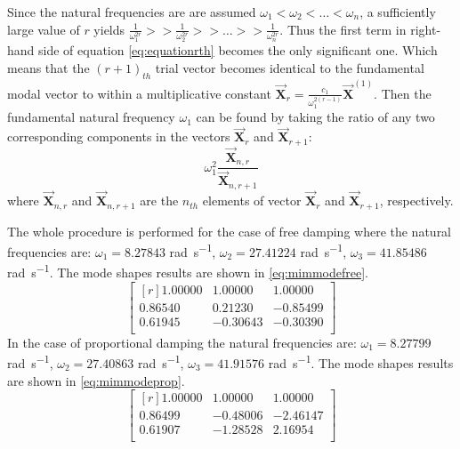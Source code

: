 Since the natural frequencies are are assumed \(\omega_1 < \omega_2 < \dots <
\omega_n\), a sufficiently large value of \(r\) yields \(\frac{1}{\omega_1^{2r}}
>> \frac{1}{\omega_2^{2r}} >> \dots >> \frac{1}{\omega_n^{2r}}\). Thus the first
term in right-hand side of equation \eqref{eq:equationrth} becomes the only
significant one.
Which means that the \((r+1)_{th}\) trial vector becomes identical to the
fundamental modal vector to within a multiplicative constant
\(\vec{\mathbf{X}}_{r} = \frac{c_1}{\omega^{2(r-1)}_{1}}\vec{\mathbf{X}}^{(1)}\).
Then the fundamental natural frequency \(\omega_1\) can be found by taking the
ratio of any two corresponding components in the vectors \(\vec{\mathbf{X}}_{r}\)
and \(\vec{\mathbf{X}}_{r+1}\):
\begin{equation}
  \omega_1^{2} \frac{\vec{\mathbf{X}}_{n,r}}{\vec{\mathbf{X}}_{n,r+1}}
\end{equation}
where \(\vec{\mathbf{X}}_{n,r}\) and \(\vec{\mathbf{X}}_{n,r+1}\) are the
\(n_{th}\) elements of vector \(\vec{\mathbf{X}}_{r}\) and
\(\vec{\mathbf{X}}_{r+1}\), respectively.

%
The whole procedure is performed for the case of free damping where the natural
frequencies are: \(\omega_{1} = 8.27843\) \si{\radian\per\second}, \(\omega_{2}
= 27.41224\) \si{\radian\per\second}, \(\omega_{3} = 41.85486\)
\si{\radian\per\second}.
The mode shapes results are shown in \eqref{eq:mimmodefree}.
\begin{equation}\label{eq:mimmodefree}
 \begin{bmatrix*}[r]
	1.00000 & 1.00000 & 1.00000 \\
	0.86540 & 0.21230 &-0.85499 \\
	0.61945 &-0.30643 &-0.30390 \\
	 \end{bmatrix*}
\end{equation}
%
In the case of proportional damping the natural frequencies are:
\(\omega_{1} = 8.27799\) \si{\radian\per\second}, \(\omega_{2} = 27.40863\)
\si{\radian\per\second}, \(\omega_{3} = 41.91576\) \si{\radian\per\second}.
The mode shapes results are shown in \eqref{eq:mimmodeprop}.
 \begin{equation}\label{eq:mimmodeprop}
 \begin{bmatrix*}[r]
	1.00000 & 1.00000 & 1.00000 \\
	0.86499 &-0.48006 &-2.46147 \\
	0.61907 &-1.28528 & 2.16954 \\
	 \end{bmatrix*}
\end{equation}
